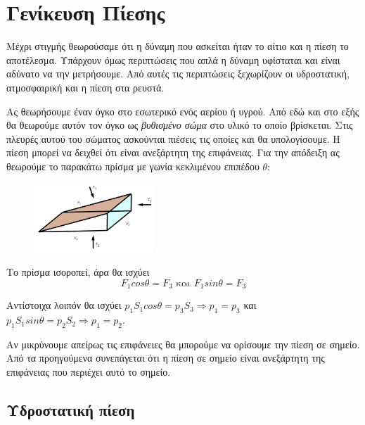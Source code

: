 \documentclass[12pt,titlepage]{article}
\begin{document}
\section{Γενίκευση Πίεσης}
Μέχρι στιγμής θεωρούσαμε ότι η δύναμη που ασκείται ήταν το αίτιο και η πίεση το αποτέλεσμα. Υπάρχουν όμως περιπτώσεις που απλά η δύναμη υφίσταται και είναι αδύνατο να την μετρήσουμε. Από αυτές τις περιπτώσεις ξεχωρίζουν οι υδροστατική, ατμοσφαιρική και η πίεση στα ρευστά.

Ας θεωρήσουμε έναν όγκο στο εσωτερικό ενός αερίου ή υγρού. Από εδώ και στο εξής θα θεωρούμε αυτόν τον όγκο ως \textit{βυθισμένο σώμα} στο υλικό το οποίο βρίσκεται. Στις πλευρές αυτού του σώματος ασκούνται πιέσεις τις οποίες και θα υπολογίσουμε. Η πίεση μπορεί να δειχθεί ότι είναι ανεξάρτητη της επιφάνειας. Για την απόδειξη ας θεωρούμε το παρακάτω πρίσμα με γωνία κεκλιμένου επιπέδου $θ$:

\begin{figure}[h]
 \includegraphics[width=0.4\textwidth]{Λευκάδα1.png}
 \centering
\end{figure}

Το πρίσμα ισοροπεί, άρα θα ισχύει
$$F_1 cosθ = F_3 \text{ και } F_1 sinθ = F_3$$

Αντίστοιχα λοιπόν θα ισχύει $p_1 S_1 cosθ = p_3 S_3 \Rightarrow p_1=p_3$ και $p_1 S_1 sinθ = p_2 S_2 \Rightarrow p_1=p_2$.

Αν μικρύνουμε απείρως τις επιφάνειες θα μπορούμε να ορίσουμε την πίεση σε σημείο. Από τα προηγούμενα συνεπάγεται ότι η πίεση σε σημείο είναι ανεξάρτητη της επιφάνειας που περιέχει αυτό το σημείο.

\subsection{Υδροστατική πίεση}
\end{document}
